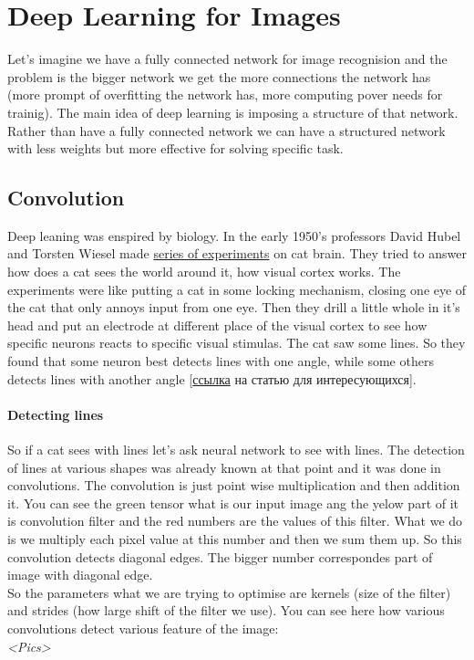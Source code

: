 \chapter{Deep Learning for Images}

{\sf Let's imagine we have a fully connected network for image recognision and the problem is the bigger network we get the more connections the network has (more prompt of overfitting the network has, more computing pover needs for trainig). The main idea of deep learning is imposing a structure of that network. Rather than have a fully connected network we can have a structured network with less weights but more effective for solving specific task.}

\section{Convolution}

Deep leaning was enspired by biology. In the early 1950's professors David Hubel and Torsten Wiesel made \href{https://youtu.be/IOHayh06LJ4}{series of experiments} on cat brain. They tried to answer how does a cat sees the world around it, how visual cortex works. The experiments were like putting a cat in some locking mechanism, closing one eye of the cat that only annoys input from one eye. Then they drill a little whole in it's head and put an electrode at different place of the visual cortex to see how specific neurons reacts to specific visual stimulas. The cat saw some lines. So they found that some neuron best detects lines with one angle, while some others detects lines with another angle [\href{https://www.ncbi.nlm.nih.gov/pmc/articles/PMC1363130/pdf/jphysiol01298-0128.pdf}{ссылка} на статью для интересующихся].

\subsubsection*{Detecting lines}

So if a cat sees with lines let's ask neural network to see with lines. The detection of lines at various shapes was already known at that point and it was done in convolutions. The convolution is just point wise multiplication and then addition it. You can see the green tensor what is our input image ang the yelow part of it is convolution filter and the red numbers are the values of this filter. What we do is we multiply each pixel value at this number and then we sum them up. So this convolution detects diagonal edges. The bigger number correspondes part of image with diagonal edge.\\
So the parameters what we are trying to optimise are kernels (size of the filter) and strides (how large shift of the filter we use). You can see here how various convolutions detect various feature of the image:\\
{\it <Pics>}\\

